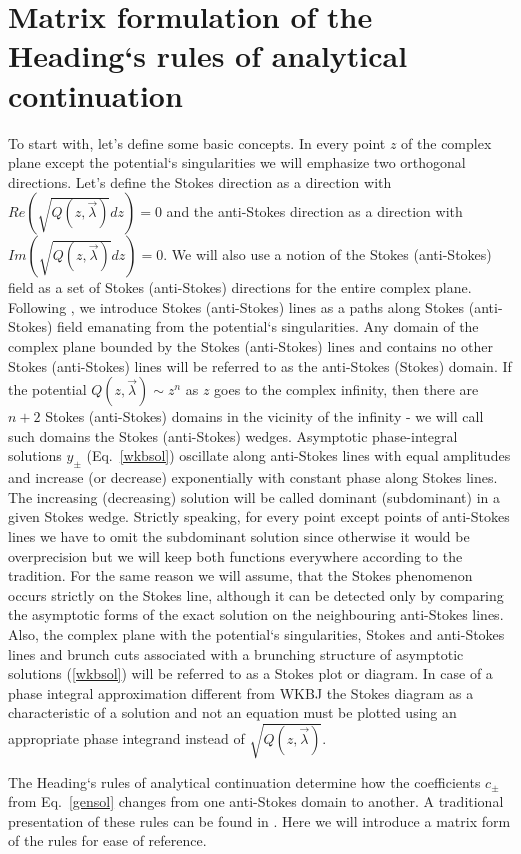 \documentclass[aps,prl,preprint,superscriptaddress]{revtex4}
\begin{document}
\section{Matrix formulation of the Heading`s rules of analytical continuation \label{MTRXFRM}}
To start with, let's define some basic concepts. In every point $z$ of the complex plane except the potential`s singularities we will emphasize two orthogonal directions. Let's define the Stokes direction 
as a direction with $Re \left( \sqrt{Q(z,\vec{\lambda})}dz \right)=0$ and the anti-Stokes direction 
as a direction with $Im \left( \sqrt{Q(z,\vec{\lambda})}dz \right)=0$. We will also use a notion of the Stokes (anti-Stokes) field as a set of Stokes (anti-Stokes) directions for the entire complex plane. Following \cite{heading, white}, we introduce Stokes (anti-Stokes) lines as a paths along Stokes (anti-Stokes) field emanating from the potential`s singularities. Any domain of the complex plane bounded by the Stokes (anti-Stokes) lines and contains no other Stokes (anti-Stokes) lines will be referred to as the anti-Stokes (Stokes) domain. If the potential $Q(z,\vec{\lambda}) \sim z^n$ as $z$ goes to the complex infinity, then there are $n+2$ Stokes (anti-Stokes) domains in the vicinity of the infinity - we will call such domains the Stokes (anti-Stokes) wedges. Asymptotic phase-integral solutions $y_\pm$ (Eq.~\ref{wkbsol}) oscillate along anti-Stokes lines with equal amplitudes and increase (or decrease) exponentially with constant phase along Stokes lines. The increasing (decreasing) solution will be called dominant (subdominant) in a given Stokes wedge. Strictly speaking, for every point except points of anti-Stokes lines we have to omit the subdominant solution since otherwise it would be overprecision but we will keep both functions everywhere according to the tradition. For the same reason we will assume, that the Stokes phenomenon occurs strictly on the Stokes line, although it can be detected only by comparing the asymptotic forms of the exact solution on the neighbouring anti-Stokes lines. Also, the complex plane with the potential`s singularities, Stokes and anti-Stokes lines and brunch cuts associated with a brunching structure of asymptotic solutions (\ref{wkbsol}) will be referred to as a Stokes plot or diagram. In case of a phase integral approximation different from WKBJ the Stokes diagram as a characteristic of a solution and not an equation must be plotted using an appropriate phase integrand instead of $\sqrt{Q(z,\vec{\lambda})}$.

The Heading`s rules of analytical continuation determine how the coefficients $c_\pm$ from Eq.~\ref{gensol} changes from one anti-Stokes domain to another. A traditional presentation of these rules can be found in \cite{heading, white}. Here we will introduce a matrix form of the rules for ease of reference.
\end{document}
